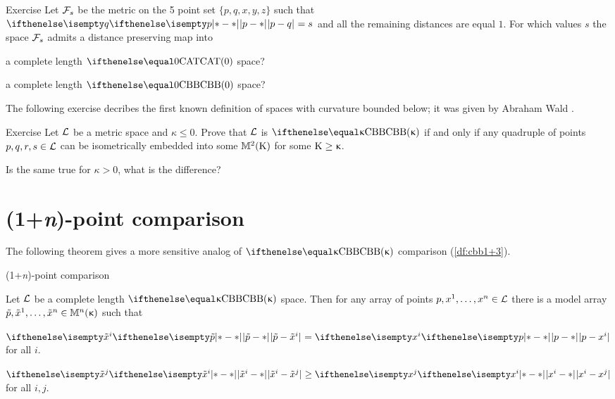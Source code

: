 \begin{thm}{Exercise}\label{ex:5-point-CBA=>CBB}
Let $\mathcal{F}_s$ be the metric
on the 5 point set $\{p,q,x,y,z\}$ such that $\dist{p}{q}{}=s$
and all the remaining distances are equal $1$.
For which values $s$ the space $\mathcal{F}_s$ admits a distance preserving map into 
\begin{subthm}{}
a complete length $\CAT{0}$ space?
\end{subthm}
\begin{subthm}{}
a complete length $\Alex{0}$ space?
\end{subthm}
\end{thm}

The following exercise decribes the first known definition of spaces with curvature bounded below;
it was given by Abraham Wald \cite{wald}. 

\begin{thm}{Exercise}\label{ex:cbb-wald}
Let $\mathcal{L}$ be a metric space and $\kappa\le 0$.
Prove that $\mathcal{L}$ is $\Alex\kappa$ if and only if  any quadruple of points $p,q,r,s\in \spc{L}$ can be isometrically embedded into some $\mathbb{M}_{{}}^{2}({\mathrm{K}})$ for some $\Kappa\ge\kappa$.

Is the same true for $\kappa>0$, what is the difference?
\end{thm}

\section{(1+\textit{n})-point comparison}\label{sec:1+n}

The following theorem gives a more sensitive analog of  $\Alex\kappa$ comparison (\ref{df:cbb1+3}).

\begin{thm}{(1+\textit{n})-point comparison}
\label{thm:pos-config} {\sloppy 
Let $\mathcal{L}$ be a complete length $\Alex{\kappa}$ space.
Then for any array of points $p,x^1,\dots,x^n\in \spc{L}$  
there is a model array $\tilde p,\tilde x^1,\dots,\tilde x^n\in\Lob{n}\kappa$ such that

}

\begin{subthm}{}
$\dist{\tilde p}{\tilde x^i}{}=\dist{p}{x^i}{}$ for all $i$.
\end{subthm}

\begin{subthm}{}$\dist{\tilde x^i}{\tilde x^j}{}\ge\dist{x^i}{x^j}{}$ for all $i,j$.
\end{subthm}
\end{thm}

